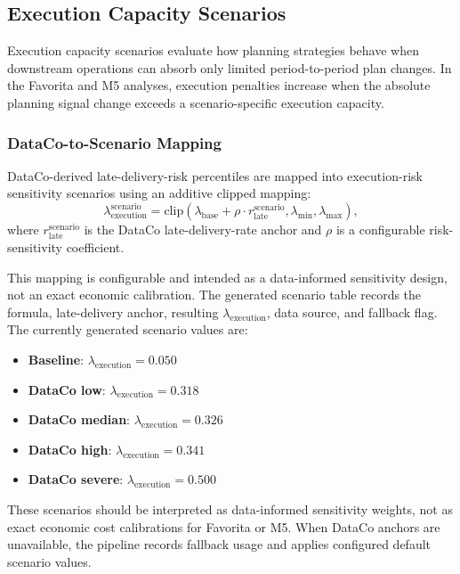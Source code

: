 \subsection{Execution Capacity Scenarios}

Execution capacity scenarios evaluate how planning strategies behave when downstream operations can absorb only limited period-to-period plan changes. In the Favorita and M5 analyses, execution penalties increase when the absolute planning signal change exceeds a scenario-specific execution capacity.

\subsubsection{DataCo-to-Scenario Mapping}

DataCo-derived late-delivery-risk percentiles are mapped into execution-risk sensitivity scenarios using an additive clipped mapping:
\begin{equation}
\lambda_{\text{execution}}^{\text{scenario}} =
\mathrm{clip}\left(
    \lambda_{\text{base}}
    + \rho \cdot r_{\text{late}}^{\text{scenario}},
    \lambda_{\min},
    \lambda_{\max}
\right),
\end{equation}
where $r_{\text{late}}^{\text{scenario}}$ is the DataCo late-delivery-rate anchor and $\rho$ is a configurable risk-sensitivity coefficient.

This mapping is configurable and intended as a data-informed sensitivity design, not an exact economic calibration. The generated scenario table records the formula, late-delivery anchor, resulting $\lambda_{\text{execution}}$, data source, and fallback flag. The currently generated scenario values are:
\begin{itemize}
    \item \textbf{Baseline}: $\lambda_{\text{execution}} = 0.050$
    \item \textbf{DataCo low}: $\lambda_{\text{execution}} = 0.318$
    \item \textbf{DataCo median}: $\lambda_{\text{execution}} = 0.326$
    \item \textbf{DataCo high}: $\lambda_{\text{execution}} = 0.341$
    \item \textbf{DataCo severe}: $\lambda_{\text{execution}} = 0.500$
\end{itemize}

These scenarios should be interpreted as data-informed sensitivity weights, not as exact economic cost calibrations for Favorita or M5. When DataCo anchors are unavailable, the pipeline records fallback usage and applies configured default scenario values.

